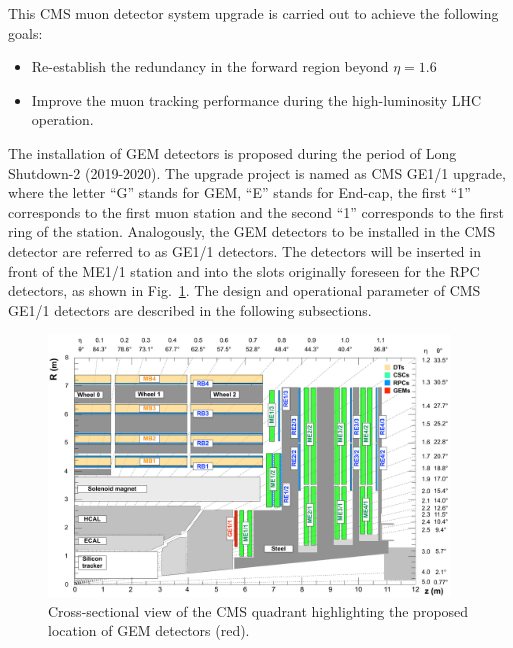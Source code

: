 This CMS muon detector system upgrade is carried out to achieve the following goals:
\begin{itemize}
    \item Re-establish the redundancy in the forward region beyond $\eta = 1.6$
    \item Improve the muon tracking performance during the high-luminosity LHC operation.
\end{itemize}
The installation of GEM detectors is proposed during the period of Long Shutdown-2 (2019-2020).
The upgrade project is named as CMS GE1/1 upgrade, where the letter ``G'' stands for GEM, ``E'' stands for End-cap, the first ``1'' corresponds to the first muon station and the second ``1'' corresponds to the first ring of the station.
Analogously, the GEM detectors to be installed in the CMS detector are referred to as GE1/1 detectors.
The detectors will be inserted in front of the ME1/1 station and into the slots originally foreseen for the RPC detectors, as shown in Fig.~\ref{fig:GE1/1pos}. The design and operational parameter of CMS GE1/1 detectors are described in the following subsections. 
\begin{figure}[!htbp]
    \centering
    \includegraphics[width=0.95\textwidth]{figures/GEM/cms_upg_o_g_b_ni_ge1_r_140227.pdf}
    \caption{Cross-sectional view of the CMS quadrant highlighting the proposed location of GEM detectors (red).}
    \label{fig:GE1/1pos}
\end{figure}

